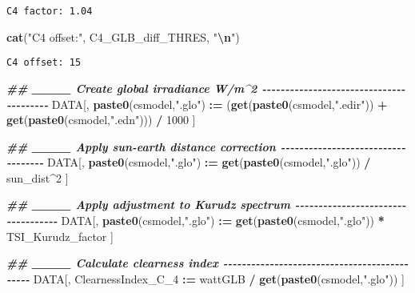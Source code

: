 \documentclass[
  10pt,
  a4paper,oneside]{article}
\newenvironment{Shaded}{\begin{snugshade}}{\end{snugshade}}
\newcommand{\DecValTok}[1]{\textcolor[rgb]{0.00,0.00,0.81}{#1}}
\newcommand{\DocumentationTok}[1]{\textcolor[rgb]{0.56,0.35,0.01}{\textbf{\textit{#1}}}}
\newcommand{\FunctionTok}[1]{\textcolor[rgb]{0.13,0.29,0.53}{\textbf{#1}}}
\newcommand{\NormalTok}[1]{#1}
\newcommand{\SpecialCharTok}[1]{\textcolor[rgb]{0.81,0.36,0.00}{\textbf{#1}}}
\newcommand{\StringTok}[1]{\textcolor[rgb]{0.31,0.60,0.02}{#1}}
\begin{document}
\begin{verbatim}
C4 factor: 1.04 
\end{verbatim}

\begin{Shaded}
\begin{Highlighting}[]
\FunctionTok{cat}\NormalTok{(}\StringTok{"C4 offset:"}\NormalTok{, C4\_GLB\_diff\_THRES, }\StringTok{"}\SpecialCharTok{\textbackslash{}n}\StringTok{"}\NormalTok{)}
\end{Highlighting}
\end{Shaded}

\begin{verbatim}
C4 offset: 15 
\end{verbatim}

\begin{Shaded}
\begin{Highlighting}[]
\DocumentationTok{\#\# \_\_\_\_ Create global irradiance W/m\^{}2  {-}{-}{-}{-}{-}{-}{-}{-}{-}{-}{-}{-}{-}{-}{-}{-}{-}{-}{-}{-}{-}{-}{-}{-}{-}{-}{-}{-}{-}{-}{-}{-}{-}{-}{-}{-}{-}{-}{-}{-}}
\NormalTok{DATA[, }\FunctionTok{paste0}\NormalTok{(csmodel,}\StringTok{".glo"}\NormalTok{) }\SpecialCharTok{:=}\NormalTok{ (}\FunctionTok{get}\NormalTok{(}\FunctionTok{paste0}\NormalTok{(csmodel,}\StringTok{".edir"}\NormalTok{)) }\SpecialCharTok{+} \FunctionTok{get}\NormalTok{(}\FunctionTok{paste0}\NormalTok{(csmodel,}\StringTok{".edn"}\NormalTok{))) }\SpecialCharTok{/} \DecValTok{1000}\NormalTok{ ]}


\DocumentationTok{\#\# \_\_\_\_ Apply sun{-}earth distance correction  {-}{-}{-}{-}{-}{-}{-}{-}{-}{-}{-}{-}{-}{-}{-}{-}{-}{-}{-}{-}{-}{-}{-}{-}{-}{-}{-}{-}{-}{-}{-}{-}{-}{-}{-}}
\NormalTok{DATA[, }\FunctionTok{paste0}\NormalTok{(csmodel,}\StringTok{".glo"}\NormalTok{) }\SpecialCharTok{:=} \FunctionTok{get}\NormalTok{(}\FunctionTok{paste0}\NormalTok{(csmodel,}\StringTok{".glo"}\NormalTok{)) }\SpecialCharTok{/}\NormalTok{ sun\_dist}\SpecialCharTok{\^{}}\DecValTok{2}\NormalTok{ ]}


\DocumentationTok{\#\# \_\_\_\_ Apply adjustment to Kurudz spectrum  {-}{-}{-}{-}{-}{-}{-}{-}{-}{-}{-}{-}{-}{-}{-}{-}{-}{-}{-}{-}{-}{-}{-}{-}{-}{-}{-}{-}{-}{-}{-}{-}{-}{-}{-}}
\NormalTok{DATA[, }\FunctionTok{paste0}\NormalTok{(csmodel,}\StringTok{".glo"}\NormalTok{) }\SpecialCharTok{:=} \FunctionTok{get}\NormalTok{(}\FunctionTok{paste0}\NormalTok{(csmodel,}\StringTok{".glo"}\NormalTok{)) }\SpecialCharTok{*}\NormalTok{ TSI\_Kurudz\_factor ]}


\DocumentationTok{\#\# \_\_\_\_ Calculate clearness index  {-}{-}{-}{-}{-}{-}{-}{-}{-}{-}{-}{-}{-}{-}{-}{-}{-}{-}{-}{-}{-}{-}{-}{-}{-}{-}{-}{-}{-}{-}{-}{-}{-}{-}{-}{-}{-}{-}{-}{-}{-}{-}{-}{-}{-}}
\NormalTok{DATA[, ClearnessIndex\_C\_4 }\SpecialCharTok{:=}\NormalTok{ wattGLB }\SpecialCharTok{/} \FunctionTok{get}\NormalTok{(}\FunctionTok{paste0}\NormalTok{(csmodel,}\StringTok{".glo"}\NormalTok{)) ]}


\end{Highlighting}
\end{Shaded}
\end{document}
